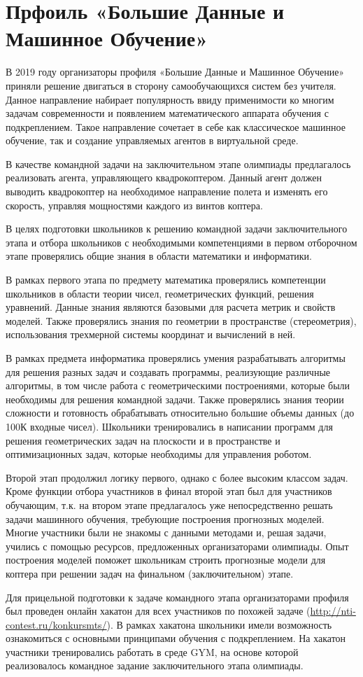 

\chapter{Прфоиль «Большие Данные и Машинное Обучение»}

В 2019 году организаторы профиля «Большие Данные и Машинное Обучение»  приняли решение двигаться в сторону самообучающихся систем без учителя. Данное направление набирает популярность ввиду применимости ко многим задачам современности и появлением математического аппарата обучения с подкреплением. Такое направление сочетает в себе как классическое машинное обучение, так и создание управляемых агентов в виртуальной среде. 

В качестве командной задачи на заключительном этапе олимпиады предлагалось реализовать агента, управляющего квадрокоптером. Данный агент должен выводить квадрокоптер на необходимое направление полета и изменять его скорость, управляя мощностями каждого из винтов коптера.

В целях подготовки школьников к решению командной задачи заключительного этапа и отбора школьников с необходимыми компетенциями в первом отборочном этапе проверялись общие знания в области математики и информатики.

В рамках первого этапа по предмету математика проверялись компетенции школьников в области теории чисел, геометрических функций, решения уравнений. Данные знания являются базовыми для расчета метрик и свойств моделей. Также проверялись знания по геометрии в пространстве (стереометрия), использования трехмерной системы координат и вычислений в ней.  

В рамках предмета информатика проверялись умения разрабатывать алгоритмы для решения разных задач и создавать программы, реализующие различные алгоритмы, в том числе работа с геометрическими построениями, которые были необходимы для решения командной задачи. Также проверялись знания теории сложности и готовность обрабатывать относительно большие объемы данных (до 100К входные чисел). Школьники тренировались в написании программ для решения геометрических задач на плоскости и в пространстве и оптимизационных задач, которые необходимы для управления роботом.

Второй этап продолжил логику первого, однако с более высоким классом задач. Кроме функции отбора участников в финал второй этап был для участников обучающим, т.к. на втором этапе предлагалось уже непосредственно решать задачи машинного обучения, требующие построения прогнозных моделей. Многие участники были не знакомы с данными методами и, решая задачи, учились с помощью ресурсов, предложенных организаторами олимпиады.  Опыт построения моделей поможет школьникам строить прогнозные модели для коптера при решении задач на финальном (заключительном) этапе.

Для прицельной подготовки к задаче командного этапа организаторами профиля был проведен онлайн хакатон для всех участников по похожей задаче (\url{http://nti-contest.ru/konkursmts/}). В рамках хакатона школьники имели возможность ознакомиться с основными принципами обучения с подкреплением. На хакатон участники тренировались работать в среде GYM, на основе которой реализовалось командное задание заключительного этапа олимпиады. 
